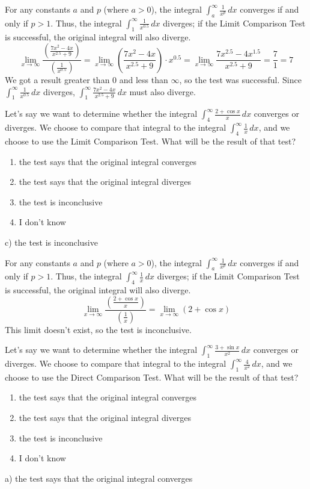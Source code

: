 \documentclass[addpoints,12pt,answers]{exam}
\begin{document}
\begin{questions}
\begin{solution}
    For any constants $a$ and $p$ (where $a>0$), the integral $\displaystyle\int_a^{\infty}\frac{1}{x^p}\,dx$ converges if and only if $p>1$. Thus, the integral $\displaystyle\int_1^\infty\frac{1}{x^{0.5}}\,dx$ diverges; if the Limit Comparison Test is successful, the original integral will also diverge.
    $$\lim_{x\to\infty}\frac{\left(\frac{7x^2-4x}{x^{2.5}+9}\right)}{\left(\frac{1}{x^{0.5}}\right)}=\lim_{x\to\infty}\left(\frac{7x^2-4x}{x^{2.5}+9}\right)\cdot x^{0.5}=\lim_{x\to\infty}\frac{7x^{2.5}-4x^{1.5}}{x^{2.5}+9}=\frac{7}{1}=7$$
    We got a result greater than 0 and less than $\infty$, so the test was successful. Since $\displaystyle\int_1^\infty\frac{1}{x^{0.5}}\,dx$ diverges, $\displaystyle\int_1^\infty\frac{7x^2-4x}{x^{2.5}+9}\,dx$ must also diverge.
  \end{solution}
  \newpage
  \question
  Let's say we want to determine whether the integral $\displaystyle\int_4^\infty\frac{2+\cos x}{x}\,dx$ converges or diverges. We choose to compare that integral to the integral $\displaystyle\int_4^\infty\frac{1}{x}\,dx$, and we choose to use the Limit Comparison Test. What will be the result of that test?
  \begin{enumerate}[label=\alph*)]
    \item
    the test says that the original integral converges
    \item
    the test says that the original integral diverges
    \item
    the test is inconclusive
    \item
    I don't know
  \end{enumerate}
  \begin{solution}
    c) the test is inconclusive
    
    For any constants $a$ and $p$ (where $a>0$), the integral $\displaystyle\int_a^{\infty}\frac{1}{x^p}\,dx$ converges if and only if $p>1$. Thus, the integral $\displaystyle\int_4^\infty\frac{1}{x}\,dx$ diverges; if the Limit Comparison Test is successful, the original integral will also diverge.
    $$\lim_{x\to\infty}\frac{\left(\frac{2+\cos x}{x}\right)}{\left(\frac{1}{x}\right)}=\lim_{x\to\infty}(2+\cos x)$$
    This limit doesn't exist, so the test is inconclusive.
  \end{solution}
  \newpage
  \question
  Let's say we want to determine whether the integral $\displaystyle\int_1^\infty\frac{3+\sin x}{x^2}\,dx$ converges or diverges. We choose to compare that integral to the integral $\displaystyle\int_1^\infty \frac{4}{x^2}\,dx$, and we choose to use the Direct Comparison Test. What will be the result of that test?
  \begin{enumerate}[label=\alph*)]
    \item
    the test says that the original integral converges
    \item
    the test says that the original integral diverges
    \item
    the test is inconclusive
    \item
    I don't know
  \end{enumerate}
  \begin{solution}
    a) the test says that the original integral converges
    

\end{solution}
\end{questions}
\end{document}
